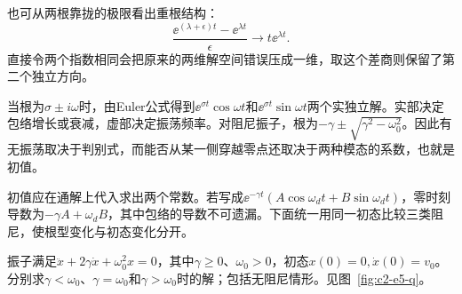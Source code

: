 也可从两根靠拢的极限看出重根结构：
\[\frac{\ee^{(\lambda+\epsilon)t}-\ee^{\lambda t}}{\epsilon}
\longrightarrow t\ee^{\lambda t}.\]
直接令两个指数相同会把原来的两维解空间错误压成一维，取这个差商则保留了第二个独立方向。

当根为$\sigma\pm i\omega$时，由Euler公式得到$\ee^{\sigma t}\cos\omega t$和$\ee^{\sigma t}\sin\omega t$两个实独立解。实部决定包络增长或衰减，虚部决定振荡频率。对阻尼振子，根为$-\gamma\pm\sqrt{\gamma^2-\omega_0^2}$。因此有无振荡取决于判别式，而能否从某一侧穿越零点还取决于两种模态的系数，也就是初值。

初值应在通解上代入求出两个常数。若写成$\ee^{-\gamma t}(A\cos\omega_dt+B\sin\omega_dt)$，零时刻导数为$-\gamma A+\omega_dB$，其中包络的导数不可遗漏。下面统一用同一初态比较三类阻尼，使根型变化与初态变化分开。

\begin{example}[同一初态下的三种阻尼]\label{ex:c2-e5}
振子满足$\ddot x+2\gamma\dot x+\omega_0^2x=0$，其中$\gamma\ge0$、$\omega_0>0$，初态$x(0)=0,\dot x(0)=v_0$。分别求$\gamma<\omega_0$、$\gamma=\omega_0$和$\gamma>\omega_0$时的解；包括无阻尼情形。见图~\ref{fig:c2-e5-q}。
\end{example}

